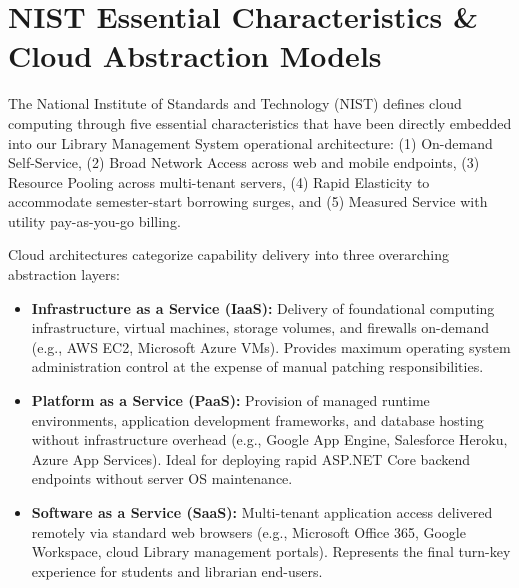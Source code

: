 \documentclass[11pt,a4paper]{report}
\begin{document}
\section{NIST Essential Characteristics \& Cloud Abstraction Models}
The National Institute of Standards and Technology (NIST) defines cloud computing through five essential characteristics that have been directly embedded into our Library Management System operational architecture: (1) On-demand Self-Service, (2) Broad Network Access across web and mobile endpoints, (3) Resource Pooling across multi-tenant servers, (4) Rapid Elasticity to accommodate semester-start borrowing surges, and (5) Measured Service with utility pay-as-you-go billing.

Cloud architectures categorize capability delivery into three overarching abstraction layers:
\begin{itemize}[leftmargin=1.5em]
    \item \textbf{Infrastructure as a Service (IaaS):} Delivery of foundational computing infrastructure, virtual machines, storage volumes, and firewalls on-demand (e.g., AWS EC2, Microsoft Azure VMs). Provides maximum operating system administration control at the expense of manual patching responsibilities.
    \item \textbf{Platform as a Service (PaaS):} Provision of managed runtime environments, application development frameworks, and database hosting without infrastructure overhead (e.g., Google App Engine, Salesforce Heroku, Azure App Services). Ideal for deploying rapid ASP.NET Core backend endpoints without server OS maintenance.
    \item \textbf{Software as a Service (SaaS):} Multi-tenant application access delivered remotely via standard web browsers (e.g., Microsoft Office 365, Google Workspace, cloud Library management portals). Represents the final turn-key experience for students and librarian end-users.
\end{itemize}
\end{document}
